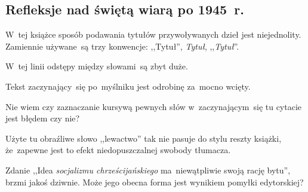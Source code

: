 \documentclass[a4paper,11pt]{article}
\begin{document}
\vspace{\spaceTwo}










\newpage
\subsection{Refleksje nad świętą wiarą po 1945~r.}

\vspace{\spaceThree}


{}



\start W~tej książce sposób podawania tytułów przywoływanych dzieł
jest niejednolity. Zamiennie używane~są trzy konwencje: ,,Tytuł'',
\emph{Tytuł}, ,,\emph{Tytuł}''.

\vspace{\spaceFour}


\start {} W~tej linii odstępy między słowami~są zbyt
duże.

\vspace{\spaceFour}


\start {} Tekst zaczynający~się po~myślniku jest odrobinę
za~mocno wcięty.

\vspace{\spaceFour}


\start {} Nie wiem czy zaznaczanie kursywą pewnych słów
w~zaczynającym~się tu cytacie jest błędem czy nie?

\vspace{\spaceFour}


\start {} Użyte tu obraźliwe słowo ,,lewactwo'' tak nie
pasuje do stylu reszty książki, że~zapewne jest to efekt
niedopuszczalnej swobody tłumacza.

\vspace{\spaceFour}


\start {} Zdanie ,,Idea \emph{socjalizmu
  chrześcijańskiego} ma~niewątpliwie swoją rację bytu'', brzmi jakoś
dziwnie. Może jego obecna forma jest wynikiem pomyłki edytorskiej?

\vspace{\spaceFour}
\end{document}
